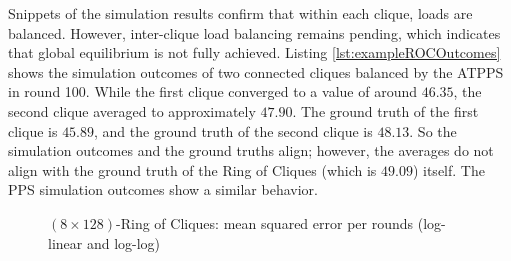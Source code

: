 Snippets of the simulation results confirm that within each clique, loads are balanced. However, inter-clique load balancing remains pending, which indicates that global equilibrium is not fully achieved. Listing \ref{lst:exampleROCOutcomes} shows the simulation outcomes of two connected cliques balanced by the ATPPS in round 100. While the first clique converged to a value of around $46.35$, the second clique averaged to approximately $47.90$. The ground truth of the first clique is $45.89$, and the ground truth of the second clique is $48.13$. So the simulation outcomes and the ground truths align; however, the averages do not align with the ground truth of the Ring of Cliques (which is $49.09$) itself. The PPS simulation outcomes show a similar behavior.
\begin{figure}[!ht]
    \centering
    \hfil
    \caption{$(8\times128)$-Ring of Cliques: mean squared error per rounds (log-linear and log-log)}
        \label{fig:128x8RingOfCliquesLog_LogLog}
\end{figure}

